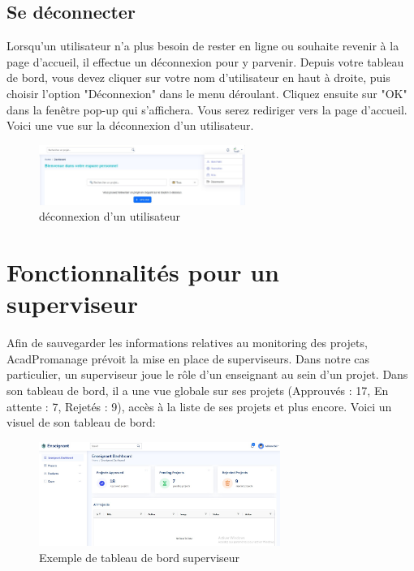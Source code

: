 \documentclass[12pt]{article}
\begin{document}
\bigskip
\subsection{Se déconnecter}
Lorsqu'un utilisateur n'a plus besoin de rester en ligne ou souhaite revenir à la page d'accueil, il effectue un déconnexion pour y parvenir. Depuis votre tableau de bord, vous devez cliquer sur votre nom d'utilisateur en haut à droite, puis choisir l'option "Déconnexion" dans le menu déroulant. Cliquez ensuite sur "OK" dans la fenêtre pop-up qui s'affichera. Vous serez rediriger vers la page d'accueil. Voici une vue sur la déconnexion d'un utilisateur.

    \begin{figure}[h!]
            \centering
            \includegraphics[width=0.6\textwidth]{./images/deconnexion-user.jpg}
            \caption{déconnexion d'un utilisateur}
            \label{fig:déconnexion d'un utilisateur}
    \end{figure}

\bigskip    
\section{Fonctionnalités pour un superviseur}
Afin de sauvegarder les informations relatives au monitoring des projets, AcadPromanage prévoit la mise en place de superviseurs. Dans notre cas particulier, un superviseur joue le rôle d'un enseignant au sein d'un projet. Dans son tableau de bord, il a une vue globale sur ses projets (Approuvés : 17, En attente : 7, Rejetés : 9), accès à la liste de ses projets et plus encore. Voici un visuel de son tableau de bord:
    \begin{figure}[h!]
        \centering
        \includegraphics[width=0.7\textwidth]{images/dashbord-enseignant.jpg}
        \caption{Exemple de tableau de bord superviseur}
        \label{fig:dashboard enseignant}
    \end{figure}
\end{document}
